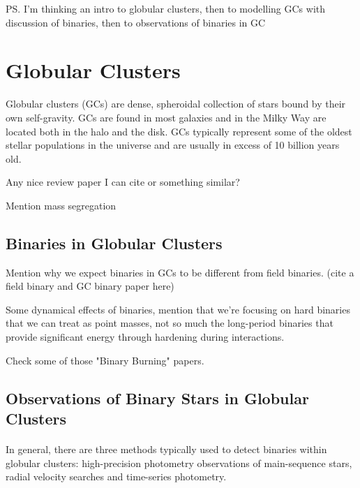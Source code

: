 \ps{I'm thinking an intro to globular clusters, then to modelling GCs with discussion of binaries,
	then to observations of binaries in GC}

\section{Globular Clusters}

Globular clusters (GCs) are dense, spheroidal collection of stars bound by their own self-gravity.
GCs are found in most galaxies and in the Milky Way are located both in the halo and the disk. GCs
typically represent some of the oldest stellar populations in the universe and are usually in excess
of 10 billion years old.

Any nice review paper I can cite or something similar?

Mention mass segregation

\subsection{Binaries in Globular Clusters}

Mention why we expect binaries in GCs to be different from field binaries. (cite a field binary and GC binary paper here)

Some dynamical effects of binaries, mention that we're focusing on hard binaries that we can treat
as point masses, not so much the long-period binaries that provide significant energy through
hardening during interactions.

Check some of those "Binary Burning" papers.

\subsection{Observations of Binary Stars in Globular Clusters}

\paragraph{}
In general, there are three methods typically used to detect binaries within globular clusters:
high-precision photometry observations of main-sequence stars, radial velocity searches and
time-series photometry.

